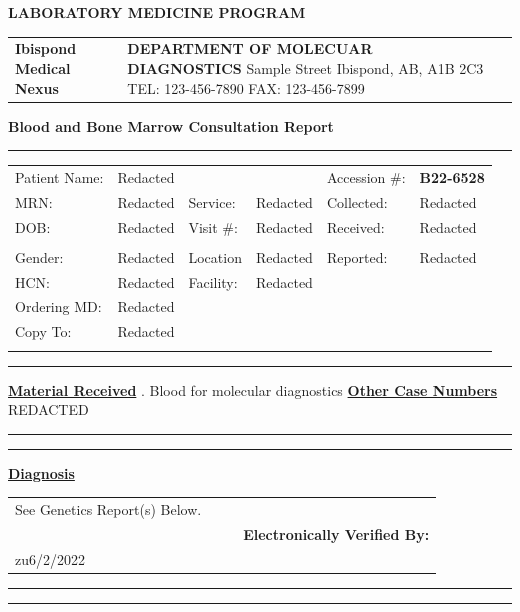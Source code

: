 \documentclass[9pt]{extarticle}
\begin{document}
\begin{center}{\LARGE \bf LABORATORY MEDICINE PROGRAM }\end{center}
\begin{tabular}{p{4cm} >{\centering \arraybackslash}p{11.59cm} p{10cm}}
{\Huge \bf Ibispond \newline Medical \newline Nexus} & {\bf DEPARTMENT OF MOLECUAR DIAGNOSTICS} \newline
123 Sample Street \newline Ibispond, AB, A1B 2C3 \newline
TEL: 123-456-7890 \newline FAX: 123-456-7899\newline
\end{tabular}
\begin{center}{\Large \bf Blood and Bone Marrow Consultation Report  \hrule }\end{center}
\begin{tabular}{p{2.5cm} p{3.75cm} p{2.5cm} p{3.75cm} p{2.5cm} p{3.75cm}}
Patient Name: & Redacted & & & Accession \#: & {\bf B22-6528} \\
MRN: & Redacted & Service: & Redacted & Collected: & Redacted\\
DOB: & Redacted & Visit \#: & Redacted & Received: &  Redacted \\
& & & & & \\
Gender: & Redacted & Location & Redacted & Reported: & Redacted \\
HCN: & Redacted & Facility: & Redacted & & \\
Ordering MD: & Redacted & & & & \\
Copy To: & Redacted &&&&\\
& & & & & \\
\end{tabular}
\hrule
\begin{raggedright} {\bf \underline {Material Received}} . Blood for molecular diagnostics 
\newline
{\bf \underline {Other Case Numbers}}\\
REDACTED \newline
\hrule
\end{raggedright}
\hrule

{\Large \underline{\bf Diagnosis}}\\
\begin{tabular}{p{5cm} p{3cm} p{2cm} p{5.75cm}}
See Genetics Report(s) Below. \newline & & & \\
&  & & {\bf Electronically Verified By:} \\
zu6/2/2022
\end{tabular}
\hrule
\hrule
\end{document}
